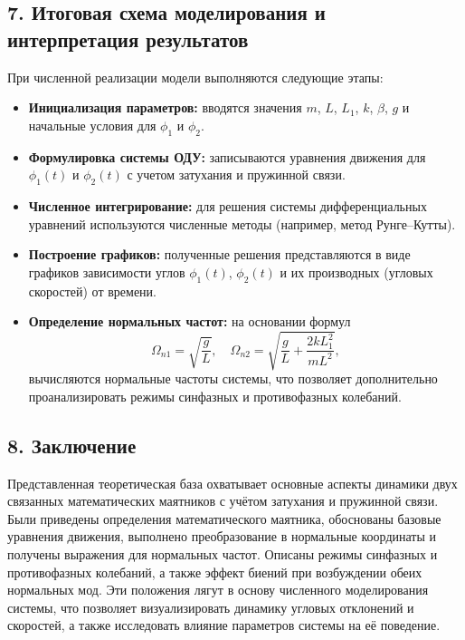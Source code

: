 \documentclass[a4paper,11pt]{article}
\theoremstyle{definition}
\begin{document}
\subsection*{7. Итоговая схема моделирования и интерпретация результатов}
При численной реализации модели выполняются следующие этапы:
\begin{itemize}
    \item \textbf{Инициализация параметров:} вводятся значения \(m\), \(L\), \(L_1\), \(k\), \(\beta\), \(g\) 
    и начальные условия для \(\phi_1\) и \(\phi_2\).
    \item \textbf{Формулировка системы ОДУ:} записываются уравнения движения для \(\phi_1(t)\) и \(\phi_2(t)\) 
    с учетом затухания и пружинной связи.
    \item \textbf{Численное интегрирование:} для решения системы дифференциальных уравнений используются 
    численные методы (например, метод Рунге--Кутты).
    \item \textbf{Построение графиков:} полученные решения представляются в виде графиков зависимости углов 
    \(\phi_1(t)\), \(\phi_2(t)\) и их производных (угловых скоростей) от времени.
    \item \textbf{Определение нормальных частот:} на основании формул
    \[
    \Omega_{n1}=\sqrt{\frac{g}{L}}, \quad \Omega_{n2}=\sqrt{\frac{g}{L}+\frac{2kL_1^2}{mL^2}},
    \]
    вычисляются нормальные частоты системы, что позволяет дополнительно проанализировать режимы синфазных 
    и противофазных колебаний.
\end{itemize}

\subsection*{8. Заключение}
Представленная теоретическая база охватывает основные аспекты динамики двух связанных математических 
маятников с учётом затухания и пружинной связи. Были приведены определения математического маятника, 
обоснованы базовые уравнения движения, выполнено преобразование в нормальные координаты и получены 
выражения для нормальных частот. Описаны режимы синфазных и противофазных колебаний, а также эффект 
биений при возбуждении обеих нормальных мод. Эти положения лягут в основу численного моделирования 
системы, что позволяет визуализировать динамику угловых отклонений и скоростей, а также 
исследовать влияние параметров системы на её поведение.
\end{document}

